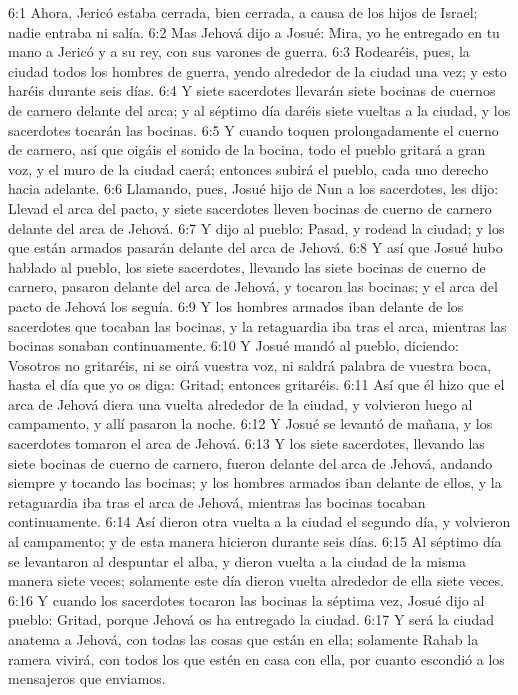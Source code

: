 6:1 Ahora, Jericó estaba cerrada, bien cerrada, a causa de los hijos de Israel; nadie entraba ni salía.  
6:2 Mas Jehová dijo a Josué: Mira, yo he entregado en tu mano a Jericó y a su rey, con sus varones de guerra.  
6:3 Rodearéis, pues, la ciudad todos los hombres de guerra, yendo alrededor de la ciudad una vez; y esto haréis durante seis días.  
6:4 Y siete sacerdotes llevarán siete bocinas de cuernos de carnero delante del arca; y al séptimo día daréis siete vueltas a la ciudad, y los sacerdotes tocarán las bocinas.  
6:5 Y cuando toquen prolongadamente el cuerno de carnero, así que oigáis el sonido de la bocina, todo el pueblo gritará a gran voz, y el muro de la ciudad caerá; entonces subirá el pueblo, cada uno derecho hacia adelante.  
6:6 Llamando, pues, Josué hijo de Nun a los sacerdotes, les dijo: Llevad el arca del pacto, y siete sacerdotes lleven bocinas de cuerno de carnero delante del arca de Jehová.  
6:7 Y dijo al pueblo: Pasad, y rodead la ciudad; y los que están armados pasarán delante del arca de Jehová.  
6:8 Y así que Josué hubo hablado al pueblo, los siete sacerdotes, llevando las siete bocinas de cuerno de carnero, pasaron delante del arca de Jehová, y tocaron las bocinas; y el arca del pacto de Jehová los seguía.  
6:9 Y los hombres armados iban delante de los sacerdotes que tocaban las bocinas, y la retaguardia iba tras el arca, mientras las bocinas sonaban continuamente.  
6:10 Y Josué mandó al pueblo, diciendo: Vosotros no gritaréis, ni se oirá vuestra voz, ni saldrá palabra de vuestra boca, hasta el día que yo os diga: Gritad; entonces gritaréis.  
6:11 Así que él hizo que el arca de Jehová diera una vuelta alrededor de la ciudad, y volvieron luego al campamento, y allí pasaron la noche.  
6:12 Y Josué se levantó de mañana, y los sacerdotes tomaron el arca de Jehová.  
6:13 Y los siete sacerdotes, llevando las siete bocinas de cuerno de carnero, fueron delante del arca de Jehová, andando siempre y tocando las bocinas; y los hombres armados iban delante de ellos, y la retaguardia iba tras el arca de Jehová, mientras las bocinas tocaban continuamente.  
6:14 Así dieron otra vuelta a la ciudad el segundo día, y volvieron al campamento; y de esta manera hicieron durante seis días.  
6:15 Al séptimo día se levantaron al despuntar el alba, y dieron vuelta a la ciudad de la misma manera siete veces; solamente este día dieron vuelta alrededor de ella siete veces.  
6:16 Y cuando los sacerdotes tocaron las bocinas la séptima vez, Josué dijo al pueblo: Gritad, porque Jehová os ha entregado la ciudad.  
6:17 Y será la ciudad anatema a Jehová, con todas las cosas que están en ella; solamente Rahab la ramera vivirá, con todos los que estén en casa con ella, por cuanto escondió a los mensajeros que enviamos.  
